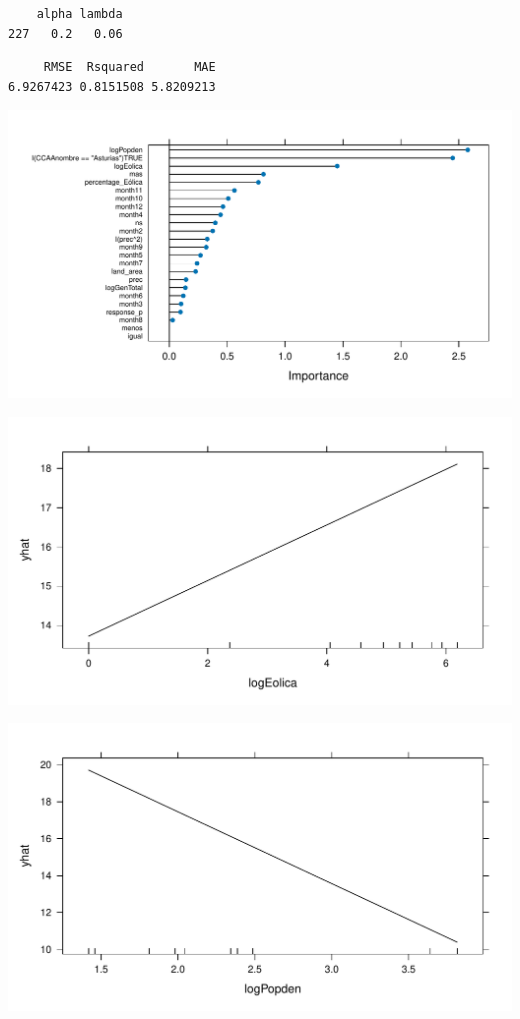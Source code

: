 \documentclass[
]{report}
\begin{document}
\begin{verbatim}
    alpha lambda
227   0.2   0.06
\end{verbatim}

\begin{verbatim}
     RMSE  Rsquared       MAE 
6.9267423 0.8151508 5.8209213 
\end{verbatim}

\includegraphics{Modelling_Energy_Intensity-V3_files/figure-pdf/unnamed-chunk-11-1.pdf}

\includegraphics{Modelling_Energy_Intensity-V3_files/figure-pdf/unnamed-chunk-11-2.pdf}

\includegraphics{Modelling_Energy_Intensity-V3_files/figure-pdf/unnamed-chunk-11-3.pdf}
\end{document}
